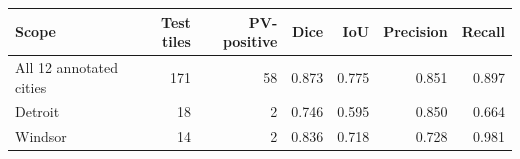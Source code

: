 \begin{tabular}{@{}lrrrrrr@{}}
\toprule
Scope & Test tiles & PV-positive & Dice & IoU & Precision & Recall \\
\midrule
All 12 annotated cities & 171 & 58 & 0.873 & 0.775 & 0.851 & 0.897 \\
Detroit & 18 & 2 & 0.746 & 0.595 & 0.850 & 0.664 \\
Windsor & 14 & 2 & 0.836 & 0.718 & 0.728 & 0.981 \\
\bottomrule
\end{tabular}
